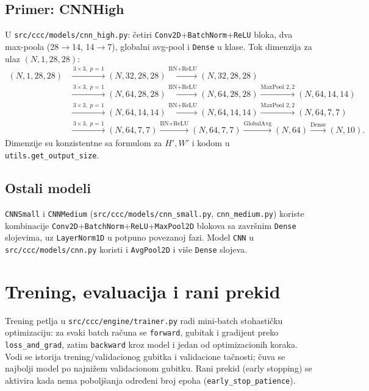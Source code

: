 \documentclass[11pt,a4paper]{article}
\begin{document}
\subsection{Primer: CNNHigh}
U \texttt{src/ccc/models/cnn\_high.py}: četiri \texttt{Conv2D}+\texttt{BatchNorm}+\texttt{ReLU} bloka, dva max-poola (28$\to$14, 14$\to$7), globalni avg-pool i \texttt{Dense} u klase. Tok dimenzija za ulaz $(N,1,28,28)$:
\begin{align*}
 (N,1,28,28) &\xrightarrow{\,3\times3,\;p{=}1\,} (N,32,28,28) \xrightarrow{\text{BN+ReLU}} (N,32,28,28)\\
 &\xrightarrow{\,3\times3,\;p{=}1\,} (N,64,28,28) \xrightarrow{\text{BN+ReLU}} (N,64,28,28) \xrightarrow{\text{MaxPool }2,2} (N,64,14,14)\\
 &\xrightarrow{\,3\times3,\;p{=}1\,} (N,64,14,14) \xrightarrow{\text{BN+ReLU}} (N,64,14,14) \xrightarrow{\text{MaxPool }2,2} (N,64,7,7)\\
 &\xrightarrow{\,3\times3,\;p{=}1\,} (N,64,7,7) \xrightarrow{\text{BN+ReLU}} (N,64,7,7) \xrightarrow{\text{GlobalAvg}} (N,64) \xrightarrow{\text{Dense}} (N,10).
\end{align*}
Dimenzije su konzistentne sa formulom za $H',W'$ i kodom u \texttt{utils.get\_output\_size}.

\subsection{Ostali modeli}
\texttt{CNNSmall} i \texttt{CNNMedium} (\texttt{src/ccc/models/cnn\_small.py}, \texttt{cnn\_medium.py}) koriste kombinacije \texttt{Conv2D}+\texttt{BatchNorm}+\texttt{ReLU}+\texttt{MaxPool2D} blokova sa završnim \texttt{Dense} slojevima, uz \texttt{LayerNorm1D} u potpuno povezanoj fazi. Model \texttt{CNN} u \texttt{src/ccc/models/cnn.py} koristi i \texttt{AvgPool2D} i više \texttt{Dense} slojeva.

\section{Trening, evaluacija i rani prekid}
Trening petlja u \texttt{src/ccc/engine/trainer.py} radi mini-batch stohastičku optimizaciju: za svaki batch računa se \texttt{forward}, gubitak i gradijent preko \texttt{loss\_and\_grad}, zatim \texttt{backward} kroz model i jedan od optimizacionih koraka. Vodi se istorija trening/validacionog gubitka i validacione tačnosti; čuva se najbolji model po najnižem validacionom gubitku. Rani prekid (early stopping) se aktivira kada nema poboljšanja određeni broj epoha (\texttt{early\_stop\_patience}).
\end{document}
